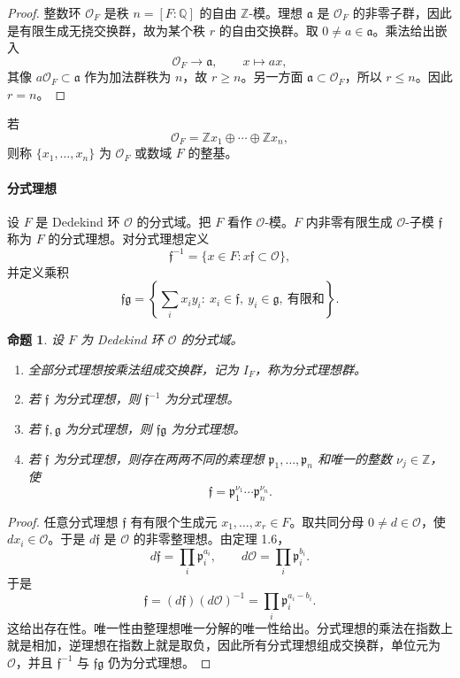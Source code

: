 \documentclass[11pt,a4paper,openany]{ctexbook}
\numberwithin{equation}{chapter}
\newcommand{\Q}{\mathbb{Q}}
\newcommand{\Z}{\mathbb{Z}}
\theoremstyle{plain}
\newtheorem{proposition}[theorem]{命题}
\theoremstyle{definition}
\theoremstyle{remark}
\begin{document}
\begin{proof}
整数环 $\mathcal O_F$ 是秩 $n=[F:\Q]$ 的自由 $\Z$-模。理想 $\mathfrak a$ 是 $\mathcal O_F$ 的非零子群，因此是有限生成无挠交换群，故为某个秩 $r$ 的自由交换群。取 $0\ne a\in\mathfrak a$。乘法给出嵌入
\[
\mathcal O_F\longrightarrow \mathfrak a,\qquad x\longmapsto ax,
\]
其像 $a\mathcal O_F\subset\mathfrak a$ 作为加法群秩为 $n$，故 $r\ge n$。另一方面 $\mathfrak a\subset\mathcal O_F$，所以 $r\le n$。因此 $r=n$。
\end{proof}

若
\[
\mathcal O_F=\Z x_1\oplus\cdots\oplus\Z x_n,
\]
则称 $\{x_1,\dots,x_n\}$ 为 $\mathcal O_F$ 或数域 $F$ 的整基。

\paragraph{分式理想}
设 $F$ 是 Dedekind 环 $\mathcal O$ 的分式域。把 $F$ 看作 $\mathcal O$-模。$F$ 内非零有限生成 $\mathcal O$-子模 $\mathfrak f$ 称为 $F$ 的分式理想。对分式理想定义
\[
\mathfrak f^{-1}=\{x\in F:x\mathfrak f\subset\mathcal O\},
\]
并定义乘积
\[
\mathfrak f\mathfrak g
=\left\{\sum_i x_i y_i:\ x_i\in\mathfrak f,\ y_i\in\mathfrak g,\ \text{有限和}\right\}.
\]

\begin{proposition}
设 $F$ 为 Dedekind 环 $\mathcal O$ 的分式域。
\begin{enumerate}[label=(\arabic*)]
\item 全部分式理想按乘法组成交换群，记为 $I_F$，称为分式理想群。
\item 若 $\mathfrak f$ 为分式理想，则 $\mathfrak f^{-1}$ 为分式理想。
\item 若 $\mathfrak f,\mathfrak g$ 为分式理想，则 $\mathfrak f\mathfrak g$ 为分式理想。
\item 若 $\mathfrak f$ 为分式理想，则存在两两不同的素理想 $\mathfrak p_1,\dots,\mathfrak p_n$ 和唯一的整数 $\nu_j\in\Z$，使
\[
\mathfrak f=\mathfrak p_1^{\nu_1}\cdots\mathfrak p_n^{\nu_n}.
\]
\end{enumerate}
\end{proposition}

\begin{proof}
任意分式理想 $\mathfrak f$ 有有限个生成元 $x_1,\dots,x_r\in F$。取共同分母 $0\ne d\in\mathcal O$，使 $dx_i\in\mathcal O$。于是 $d\mathfrak f$ 是 $\mathcal O$ 的非零整理想。由定理 1.6，
\[
d\mathfrak f=\prod_i\mathfrak p_i^{a_i},
\qquad
d\mathcal O=\prod_i\mathfrak p_i^{b_i}.
\]
于是
\[
\mathfrak f=(d\mathfrak f)(d\mathcal O)^{-1}
=\prod_i\mathfrak p_i^{a_i-b_i}.
\]
这给出存在性。唯一性由整理想唯一分解的唯一性给出。分式理想的乘法在指数上就是相加，逆理想在指数上就是取负，因此所有分式理想组成交换群，单位元为 $\mathcal O$，并且 $\mathfrak f^{-1}$ 与 $\mathfrak f\mathfrak g$ 仍为分式理想。
\end{proof}
\end{document}
